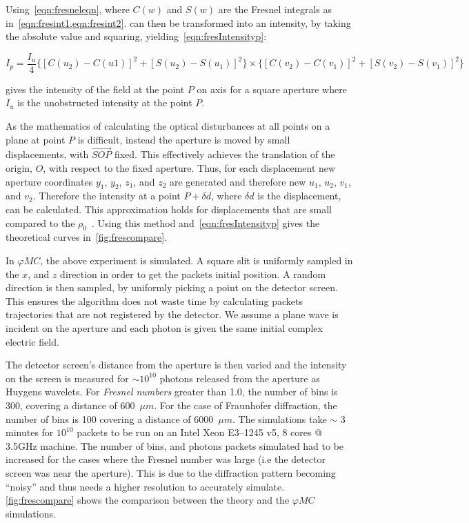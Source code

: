Using~\cref{eqn:fresneleqn}, where $C(w)$ and $S(w)$ are the Fresnel integrals as in~\cref{eqn:fresint1,eqn:fresint2}.
 can then be transformed into an intensity, by taking the absolute value and squaring, yielding~\cref{eqn:fresIntensityp}:


\begin{equation}
I_p = \frac{I_u}{4} \{[C(u_2) - C(u1)]^2 + [S(u_2) - S(u_1)]^2\} \times \{[C(v_2) - C(v_1)]^2 + [S(v_2) - S(v_1)]^2\}
\label{eqn:fresIntensityp}
\end{equation}

 gives the intensity of the field at the point $P$ on axis for a square aperture where $I_u$ is the unobstructed intensity at the point $P$. 

\medskip

As the mathematics of calculating the optical disturbances at all points on a plane at point $P$ is difficult, instead the aperture is moved by small displacements, with $\overrightarrow{SOP}$ fixed.
This effectively achieves the translation of the origin, $O$, with respect to the fixed aperture. 
Thus, for each displacement new aperture coordinates $y_1$, $y_2$, $z_1$, and $z_2$ are generated and therefore new $u_1$, $u_2$, $v_1$, and $v_2$.
Therefore the intensity at a point $P +\delta d$, where $\delta d$ is the displacement, can be calculated.
This approximation holds for displacements that are small compared to the $\rho_0$~\cite{born2000principles,hecht2017optics,goodman2017introduction}.
Using this method and~\cref{eqn:fresIntensityp} gives the theoretical curves in~\cref{fig:frescompare}.

\medskip

In $\varphi MC$, the above experiment is simulated. 
A square slit is uniformly sampled in the $x$, and $z$ direction in order to get the packets initial position. 
A random direction is then sampled, by uniformly picking a point on the detector screen.
This ensures the algorithm does not waste time by calculating packets trajectories that are not registered by the detector.
We assume a plane wave is incident on the aperture and each photon is given the same initial complex electric field.

The detector screen's distance from the aperture is then varied and the intensity on the screen is measured for $\sim 10^{10}$ photons released from the aperture as Huygens wavelets.
For \textit{Fresnel numbers} greater than 1.0, the number of bins is 300, covering a distance of 600~$\mu m$. 
For the case of Fraunhofer diffraction, the number of bins is 100 covering a distance of 6000~$\mu m$.
The simulations take $\sim$ 3 minutes for $10^{10}$ packets to be run on an Intel Xeon E3--1245 v5, 8 cores @ 3.5GHz machine.
The number of bins, and photons packets simulated had to be increased for the cases where the Fresnel number was large (i.e the detector screen was near the aperture).
This is due to the diffraction pattern becoming ``noisy'' and thus needs a higher resolution to accurately simulate.
\cref{fig:frescompare} shows the comparison between the theory and the $\varphi MC$ simulations.


